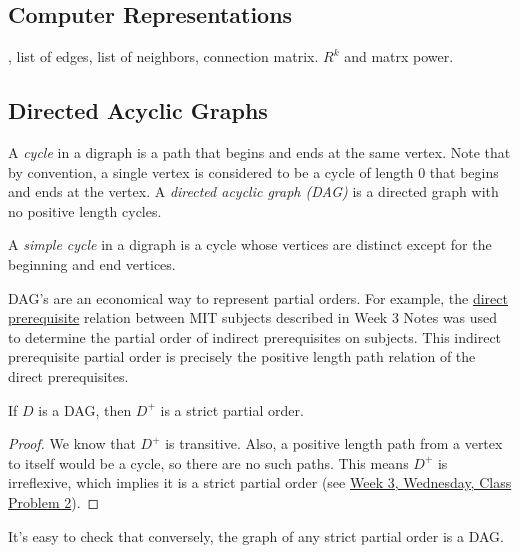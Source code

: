 \subsection{Computer Representations 
}

, list of edges, list of neighbors, connection matrix.
$R^k$ and matrx power. 


\subsection{Directed Acyclic Graphs}\label{sec:dag}

\begin{definition}
A \emph{cycle} in a digraph is a path that begins and ends at the same
vertex.  Note that by convention, a single vertex is considered to be a
cycle of length 0 that begins and ends at the vertex.  A \emph{directed
acyclic graph (DAG)} is a directed graph with no positive length cycles.

A \emph{simple cycle} in a digraph is a cycle whose vertices are distinct
except for the beginning and end vertices.
\end{definition}

DAG's are an economical way to represent partial orders.  For example, the
\href{http://courses.csail.mit.edu/6.042/spring09/ln3.pdf#partial.orders}
{direct prerequisite} relation between MIT subjects described in Week 3
Notes was used to determine the partial order of indirect prerequisites on
subjects.  This indirect prerequisite partial order is precisely the
positive length path relation of the direct prerequisites.

\begin{lemma}
If $D$ is a DAG, then $D^+$ is a strict partial order.
\end{lemma}

\begin{proof}
We know that $D^+$ is transitive.  Also, a positive length path from a
vertex to itself would be a cycle, so there are no such paths.  This means
$D^+$ is irreflexive, which implies it is a strict partial order (see
\href{http://courses.csail.mit.edu/6.042/spring09/cp3r.pdf}{Week 3,
Wednesday, Class Problem 2}).
\end{proof}

It's easy to check that conversely, the graph of any strict partial order
is a DAG.

